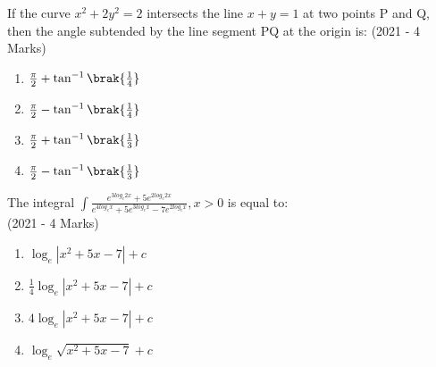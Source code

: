  	\item{
			If the curve $x^2 + 2y^2 = 2$ intersects the line $x + y = 1$ at two points P and Q, then the angle subtended by the line segment PQ at the origin is:
			\hfill
			{(2021 - 4 Marks)}
			
			\begin{multicols}{4}
				\begin{enumerate}
					\item $\frac{\pi}{2} + \tan^{-1}\brak{\frac{1}{4}}$
					\item $\frac{\pi}{2} - \tan^{-1}\brak{\frac{1}{4}}$
					\item $\frac{\pi}{2} + \tan^{-1}\brak{\frac{1}{3}}$
					\item $\frac{\pi}{2} - \tan^{-1}\brak{\frac{1}{3}}$
				\end{enumerate}
			\end{multicols}
			
		}
 	\item{
			The integral $\int\frac{e^{3log_{e}2x} + 5e^{2log_{e}2x}}{e^{4log_{e}x}+ 5e^{3log_{e}x} - 7e^{2log_{e}x}}, x>0$ is equal to:\\ \text{ }
			\hfill
			{(2021 - 4 Marks)}
			
			\begin{multicols}{2}
				\begin{enumerate}
					\item $\log_e |x^2 + 5x - 7| + c$
					
					\item $\frac{1}{4} \log_e |x^2 + 5x - 7| + c$
					
					\item $4 \log_e |x^2 + 5x - 7| + c$
					
					\item $\log_e \sqrt{x^2 + 5x - 7} + c$
				\end{enumerate}
			\end{multicols}
			
		}
